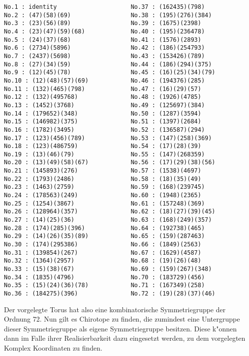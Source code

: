 \begin{verbatim}
No.1 : identity                     No.37 : (162435)(798)
No.2 : (47)(58)(69)                 No.38 : (195)(276)(384)
No.3 : (23)(56)(89)                 No.39 : (1675)(2398)
No.4 : (23)(47)(59)(68)             No.40 : (195)(236478)
No.5 : (24)(37)(68)                 No.41 : (1576)(2893)
No.6 : (2734)(5896)                 No.42 : (186)(254793)
No.7 : (2437)(5698)                 No.43 : (153426)(789)
No.8 : (27)(34)(59)                 No.44 : (186)(294)(375)
No.9 : (12)(45)(78)                 No.45 : (16)(25)(34)(79)
No.10 : (12)(48)(57)(69)            No.46 : (194376)(285)
No.11 : (132)(465)(798)             No.47 : (16)(29)(57)
No.12 : (132)(495768)               No.48 : (1926)(4785)
No.13 : (1452)(3768)                No.49 : (125697)(384)
No.14 : (179652)(348)               No.50 : (1287)(3594)
No.15 : (146982)(375)               No.51 : (1397)(2684)
No.16 : (1782)(3495)                No.52 : (136587)(294)
No.17 : (123)(456)(789)             No.53 : (147)(258)(369)
No.18 : (123)(486759)               No.54 : (17)(28)(39)
No.19 : (13)(46)(79)                No.55 : (147)(268359)
No.20 : (13)(49)(58)(67)            No.56 : (17)(29)(38)(56)
No.21 : (145893)(276)               No.57 : (1538)(4697)
No.22 : (1793)(2486)                No.58 : (18)(35)(49)
No.23 : (1463)(2759)                No.59 : (168)(239745)
No.24 : (178563)(249)               No.60 : (1948)(2365)
No.25 : (1254)(3867)                No.61 : (157248)(369)
No.26 : (128964)(357)               No.62 : (18)(27)(39)(45)
No.27 : (14)(25)(36)                No.63 : (168)(249)(357)
No.28 : (174)(285)(396)             No.64 : (192738)(465)
No.29 : (14)(26)(35)(89)            No.65 : (159)(287463)
No.30 : (174)(295386)               No.66 : (1849)(2563)
No.31 : (139854)(267)               No.67 : (1629)(4587)
No.32 : (1364)(2957)                No.68 : (19)(26)(48)
No.33 : (15)(38)(67)                No.69 : (159)(267)(348)
No.34 : (1835)(4796)                No.70 : (183729)(456)
No.35 : (15)(24)(36)(78)            No.71 : (167349)(258)
No.36 : (184275)(396)               No.72 : (19)(28)(37)(46)
\end{verbatim}
Der vorgelegte Torus hat also eine kombinatorische Symmetriegruppe der
Ordnung 72. Nun gilt es Chirotope zu finden, die zumindest eine Untergruppe
dieser Symmetriegruppe als eigene Symmetriegruppe besitzen. Diese k"onnen dann
im Falle ihrer Realisierbarkeit dazu eingesetzt werden, zu dem vorgelegten
Komplex Koordinaten zu finden.

